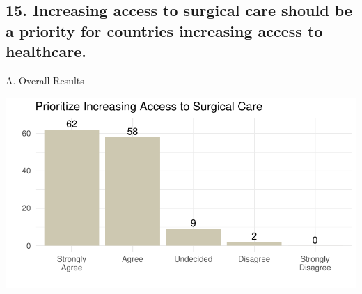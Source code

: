 \documentclass[
  letterpaper,
  DIV=11,
  numbers=noendperiod]{scrartcl}
\begin{document}
\newpage

\hypertarget{increasing-access-to-surgical-care-should-be-a-priority-for-countries-increasing-access-to-healthcare.}{%
\subsection{15. Increasing access to surgical care should be a priority
for countries increasing access to
healthcare.}\label{increasing-access-to-surgical-care-should-be-a-priority-for-countries-increasing-access-to-healthcare.}}

A. Overall Results

\includegraphics{GlobalHealthQuarto11-15_files/figure-pdf/unnamed-chunk-17-1.pdf}
\end{document}
